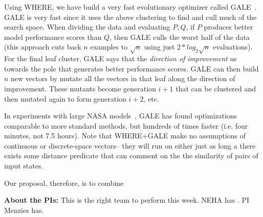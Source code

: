 \documentclass[12pt]{article}
\begin{document}
Using WHERE, we have build a very fast     evolutionary optimizer
called GALE~\cite{krall2015gale}. 
GALE is very fast since it uses the above clustering to find and cull much of the 
search space.
When dividing the data and 
evaluating   $P,Q$, if $P$ produces better model performance scores than $Q$, then
GALE  culls   the worst half of the data (this approach cuts back $n$ examples to $\sqrt{n}$ using
just $2*log_2{\sqrt{n}}$ evaluations). 
For the final leaf cluster, GALE says that the {\em direction of improvement} us
towards the pole
that generates better performance scores. GALE can then build $n$ new vectors by mutate
all the vectors in that leaf along the direction of improvement. 
These mutants become
generation $i+1$ that can be clustered  and then mutated again to form
generation $i+2$, etc.

In experiments with large NASA models~\cite{me15z}, GALE has found optimizations comparable to more standard methods, but hundreds of times faster (i.e. four minutes, not 7.5 hours). Note that WHERE+GALE make no assumptions of continuous or discrete-space vectors-- they
will run on either just as long a there exists some distance predicate that can comment on
the the similarity of pairs of input states.



Our proposal, therefore, is to combine 

{\bf About the PIs:} This is the right team to perform this week. NEHA has . PI Menzies has.


\newpage


\end{document}
